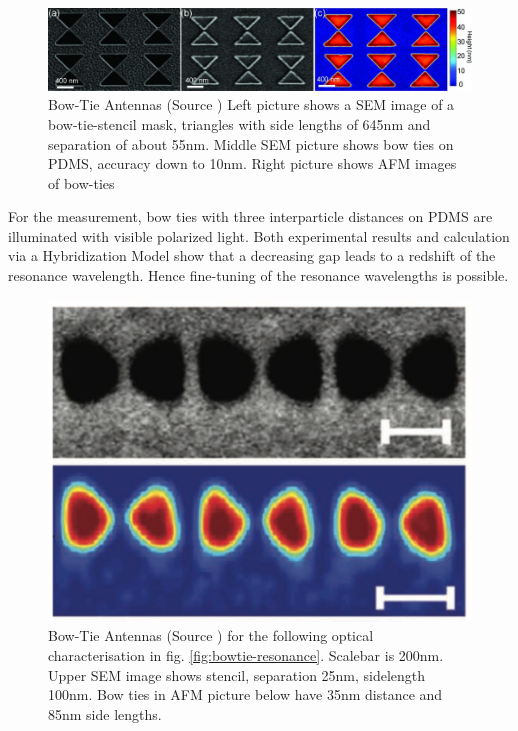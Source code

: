 \documentclass[journal, a4paper]{IEEEtran}
\begin{document}
\begin{figure}[hbt!]
\begin{center}
\includegraphics[width=\columnwidth]{09bowties.jpg}
\caption{Bow-Tie Antennas (Source \cite{paper}) Left picture shows a SEM image of a bow-tie-stencil mask, triangles with side lengths of 645nm and separation of about 55nm. Middle SEM picture shows bow ties on PDMS, accuracy down to 10nm. Right picture shows AFM images of bow-ties}
\label{fig:bowties}
\end{center}
\end{figure}

For the measurement, bow ties with three interparticle distances on PDMS are illuminated with visible polarized light. Both experimental results and calculation via a Hybridization Model show that a decreasing gap leads to a redshift of the resonance wavelength. Hence fine-tuning of the resonance wavelengths is possible.

\begin{figure}[hbt!]
\begin{center}
\includegraphics[width=0.4\columnwidth]{092bowties.png}
\caption{Bow-Tie Antennas (Source \cite{paper}) for the following optical characterisation in fig. \ref{fig:bowtie-resonance}. Scalebar is 200nm. Upper SEM image shows stencil, separation 25nm, sidelength 100nm. Bow ties in AFM picture below have 35nm distance and 85nm side lengths.}
\label{fig:bowties2}
\end{center}
\end{figure}
\end{document}
